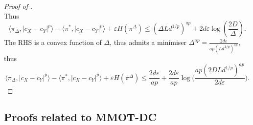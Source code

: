 \begin{proof}[Proof of ]
\begin{equation}
  \end{equation}
  Thus
  \begin{equation}
    \langle \pi_{\Delta}, \vert c_X - c_Y \vert^p \rangle -
    \langle \pi^*, \vert c_X - c_Y \vert^p \rangle + \varepsilon H(\pi^{\Delta})
    \leq (\Delta Ld^{1/p})^{ap} + 2 d \varepsilon \log(\frac{2D}{\Delta}).
  \end{equation}
  The RHS is a convex function of $\Delta$, thus admits a minimiser
  $\Delta^{ap} = \frac{2d \varepsilon}{ap (Ld^{1/p})^{ap}}$, thus
  \begin{equation}
    \langle \pi_{\Delta}, \vert c_X - c_Y \vert^p \rangle
    - \langle \pi^*, \vert c_X - c_Y \vert^p \rangle + \varepsilon H(\pi^{\Delta})
    \leq \frac{2 d \varepsilon}{ap}
    + \frac{2d \varepsilon}{ap} \log\Big( \frac{ap (2DLd^{1/p})^{ap}}{2d \varepsilon} \Big).
  \end{equation}
\end{proof}

\subsection{Proofs related to MMOT-DC} \label{appendix:subsec_mmot_dc}

